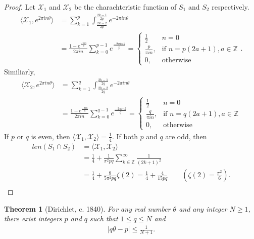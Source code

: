 \documentclass[a4paper,10pt]{amsart}
\newtheorem{theorem}{Theorem}[section]
\newcommand{\X}{\mathcal X}
\newcommand{\Z}{\mathbb Z} %
\begin{document}
\begin{proof}
    Let $\X_{1}$ and $\X_{2}$ be the charachteristic function of $S_1$
    and $S_2$ respectively.
    \begin{align*}
        \langle \X_1, e^{2\pi in \theta}\rangle &= 
        \sum_{k=1}^{p}
        \int_{\frac{2k-2}{2p}}^{\frac{2k-1}{2p}} e^{-2\pi in \theta}\\
        &=\frac{1-e^{\frac{-\pi in}{p}}}{2\pi in}
        \sum_{k=0}^{p-1}e^{\frac{-2\pi ink}{p}} 
        = \begin{cases}
             \frac{1}{2} & n = 0\\
             \frac{p}{\pi i n}, & \mbox{if } n = p(2a + 1), a \in \Z \\
             0, & \mbox{otherwise}
          \end{cases}.
    \end{align*}
    Similiarly,
    \begin{align*}
        \langle \X_2, e^{2\pi in \theta}\rangle &= 
        \sum_{k=1}^{q}
        \int_{\frac{2k-2}{2q}}^{\frac{2k-1}{2q}} e^{-2\pi in \theta}\\
        &=\frac{1-e^{\frac{-\pi in}{q}}}{2\pi in}
        \sum_{k=0}^{q-1}e^{\frac{-2\pi ink}{q}} 
        = \begin{cases}
             \frac{1}{2} & n = 0\\
              \frac{q}{\pi i n}, & \mbox{if } n=q(2a + 1), a \in \Z  \\
              0, & \mbox{otherwise} 
          \end{cases}
    \end{align*}
    If $p$ or $q$ is even, then $\langle \X_1, \X_2 \rangle = \frac{1}{4}$.
    If both $p$ and $q$ are odd, then
    \begin{align*}
        len(S_1 \cap S_2)&=\langle \X_1, \X_2 \rangle \\
        &= \frac{1}{4} + \frac{1}{\pi^2 pq}
        \sum_{k \in \Z }^{\infty}\frac{1}{(2k+1)^2}\\ 
        &= \frac{1}{4} + \frac{8}{5\pi^2 pq}\zeta(2)
         = \frac{1}{4} + \frac{4}{15pq}
        \qquad (\zeta(2) = \frac{\pi^2}{6}).\\
    \end{align*} 
\end{proof}

\begin{theorem}[Dirichlet, c. 1840]
   For any real number $\theta$ and any integer $N \geq 1$, there exist
   integers $p$ and $q$ such that $1 \leq q \leq N$ and 
   \begin{align*}
       |q\theta - p| \leq \frac{1}{N+1}. 
   \end{align*}
\end{theorem}
\end{document}
